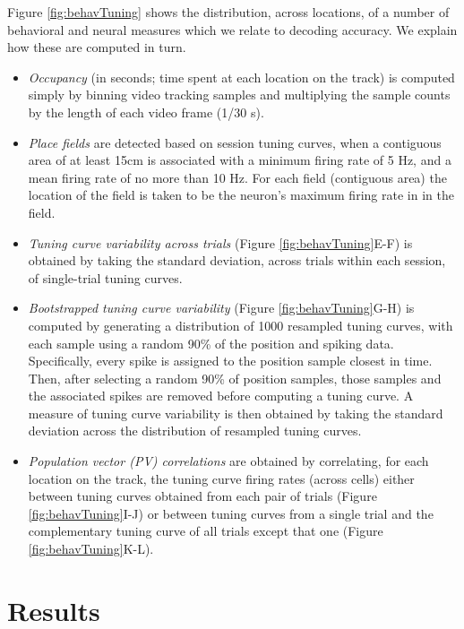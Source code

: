 \documentclass[11pt]{article}
\begin{document}
{\color{black}{\bf Inventory of behavioral and neural measures used.}
  Figure \ref{fig:behavTuning} shows the distribution, across
  locations, of a number of behavioral and neural measures which we
  relate to decoding accuracy. We explain how these are computed in
  turn.

\begin{itemize}
\item{{\it Occupancy} (in seconds; time spent at each location on the
  track) is computed simply by binning video tracking samples and
  multiplying the sample counts by the length of each video frame
  (1/30 s).}
\item{{\it Place fields} are detected based on session tuning curves,
  when a contiguous area of at least 15cm is associated with a minimum
  firing rate of 5 Hz, and a mean firing rate of no more than 10
  Hz. For each field (contiguous area) the location of the field is
  taken to be the neuron's maximum firing rate in in the field.}
\item{{\it Tuning curve variability across trials} (Figure
  \ref{fig:behavTuning}E-F) is obtained by taking the standard
  deviation, across trials within each session, of single-trial tuning
  curves.}
\item{{\it Bootstrapped tuning curve variability} (Figure
  \ref{fig:behavTuning}G-H) is computed by generating a distribution
  of 1000 resampled tuning curves, with each sample using a random
  90\% of the position and spiking data. Specifically, every spike is
  assigned to the position sample closest in time. Then, after
  selecting a random 90\% of position samples, those samples and the
  associated spikes are removed before computing a tuning curve. A
  measure of tuning curve variability is then obtained by taking the
  standard deviation across the distribution of resampled tuning
  curves.}
\item{{\it Population vector (PV) correlations} are obtained by
  correlating, for each location on the track, the tuning curve firing
  rates (across cells) either between tuning curves obtained from each
  pair of trials (Figure \ref{fig:behavTuning}I-J) or between tuning
  curves from a single trial and the complementary tuning curve of all
  trials except that one (Figure \ref{fig:behavTuning}K-L).}
\end{itemize}
}

\section*{Results}
\end{document}
